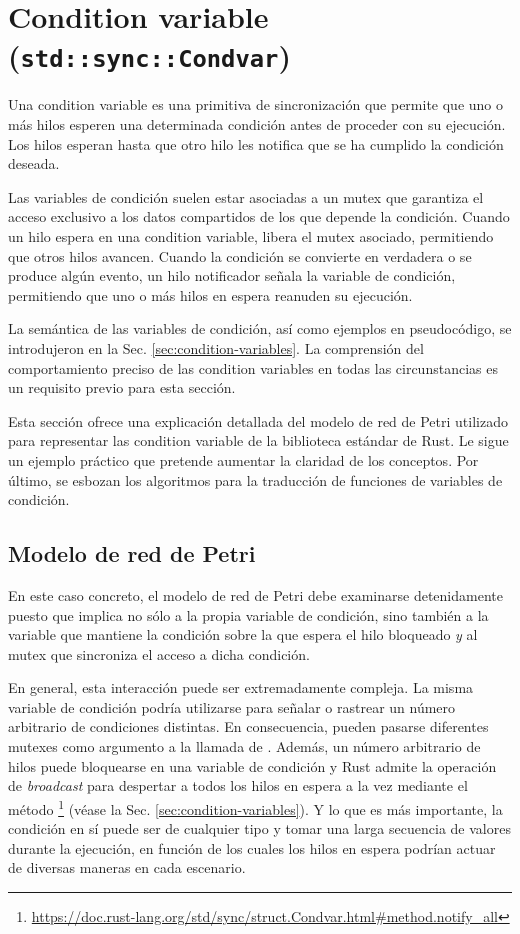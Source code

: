 \section{Condition variable (\texttt{std::sync::Condvar})}

Una condition variable es una primitiva de sincronización que
permite que uno o más hilos esperen una determinada condición antes de proceder con
su ejecución. Los hilos esperan hasta que otro hilo les notifica que se ha cumplido la
condición deseada.

Las variables de condición suelen estar asociadas a un mutex que garantiza el acceso exclusivo
a los datos compartidos de los que depende la condición.
Cuando un hilo espera en una condition variable,
libera el mutex asociado, permitiendo que otros hilos avancen.
Cuando la condición se convierte en verdadera o se produce algún evento,
un hilo notificador señala la variable de condición,
permitiendo que uno o más hilos en espera reanuden su ejecución.

La semántica de las variables de condición, así como ejemplos en pseudocódigo, se
introdujeron en la Sec. \ref{sec:condition-variables}.
La comprensión del comportamiento preciso de las condition variables
en todas las circunstancias es un requisito previo para esta sección.

Esta sección ofrece una explicación detallada del modelo de red de Petri utilizado para representar las
condition variable de la biblioteca estándar de Rust. Le sigue un ejemplo práctico que
pretende aumentar la claridad de los conceptos. Por último, se esbozan los algoritmos para la
traducción de funciones de variables de condición.

\subsection{Modelo de red de Petri}

En este caso concreto, el modelo de red de Petri debe examinarse detenidamente
puesto que implica no sólo a
la propia variable de condición,
sino también a la variable que mantiene la condición sobre la
que espera el hilo bloqueado \emph{y} al mutex que sincroniza el acceso a dicha condición.

En general, esta interacción puede ser extremadamente compleja.
La misma variable de condición podría utilizarse
para señalar o rastrear un número arbitrario de condiciones distintas.
En consecuencia, pueden pasarse diferentes mutexes como argumento a la llamada de
.
Además, un número arbitrario de hilos puede bloquearse en una variable de condición y
Rust admite la operación de \emph{broadcast} para despertar a todos los hilos en espera a la vez
mediante el método \footnote{\url{https://doc.rust-lang.org/std/sync/struct.Condvar.html\#method.notify_all}}
(véase la Sec. \ref{sec:condition-variables}).
Y lo que es más importante, la condición
en sí puede ser de cualquier tipo y tomar una larga secuencia de valores durante la ejecución,
en función de los cuales los hilos en espera podrían actuar de diversas maneras en cada
escenario.


